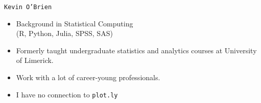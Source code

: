 \documentclass{beamer}
\begin{document}
\begin{frame}
	\Large
	\texttt{Kevin O'Brien}
	\medskip
	\begin{itemize}
		\item Background in Statistical Computing \\
		{\large (R, Python, Julia, SPSS, SAS)}
		\medskip
		\item Formerly taught undergraduate statistics and analytics courses at University of Limerick.
		\medskip
		\item Work with a lot of career-young professionals.
		\medskip
		\item I have no connection to \texttt{plot.ly}
	\end{itemize}
\end{frame}
\end{document}
